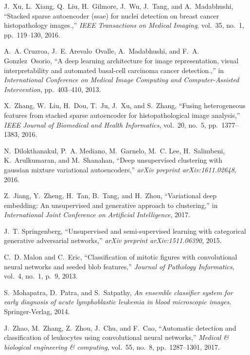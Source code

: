 \documentclass[journal]{IEEEtran}
\begin{document}
\begin{thebibliography}{10}
J.~Xu, L.~Xiang, Q.~Liu, H.~Gilmore, J.~Wu, J.~Tang, and A.~Madabhushi,
  ``Stacked sparse autoencoder (ssae) for nuclei detection on breast cancer
  histopathology images.,'' {\em IEEE Transactions on Medical Imaging},
  vol.~35, no.~1, pp.~119--130, 2016.

A.~A. Cruzroa, J.~E. Arevalo~Ovalle, A.~Madabhushi, and F.~A. Gonzlez~Osorio,
  ``A deep learning architecture for image representation, visual
  interpretability and automated basal-cell carcinoma cancer detection.,'' in
  {\em International Conference on Medical Image Computing and
  Computer-Assisted Intervention}, pp.~403--410, 2013.

X.~Zhang, W.~Liu, H.~Dou, T.~Ju, J.~Xu, and S.~Zhang, ``Fusing heterogeneous features from stacked sparse autoencoder for histopathological image analysis,''{\em
    IEEE Journal of Biomedical and Health Informatics}, vol.~20, no.~5, pp.~1377--1383, 2016.

N.~Dilokthanakul, P.~A. Mediano, M.~Garnelo, M.~C. Lee, H.~Salimbeni,
  K.~Arulkumaran, and M.~Shanahan, ``Deep unsupervised clustering with gaussian
  mixture variational autoencoders,'' {\em arXiv preprint arXiv:1611.02648},
  2016.

Z.~Jiang, Y.~Zheng, H.~Tan, B.~Tang, and H.~Zhou, ``Variational deep embedding:
  An unsupervised and generative approach to clustering,'' in {\em
  International Joint Conference on Artificial Intelligence}, 2017.

J.~T. Springenberg, ``Unsupervised and semi-supervised learning with
  categorical generative adversarial networks,'' {\em arXiv preprint
  arXiv:1511.06390}, 2015.

C.~D. Malon and C.~Eric, ``Classification of mitotic figures with convolutional
  neural networks and seeded blob features,'' {\em Journal of Pathology
  Informatics}, vol.~4, no.~1, p.~9, 2013.

S.~Mohapatra, D.~Patra, and S.~Satpathy, {\em An ensemble classifier system for
  early diagnosis of acute lymphoblastic leukemia in blood microscopic images}.
\newblock Springer-Verlag, 2014.

J.~Zhao, M.~Zhang, Z.~Zhou, J.~Chu, and F.~Cao, ``Automatic detection and
  classification of leukocytes using convolutional neural networks,'' {\em
  Medical \& biological engineering \& computing}, vol.~55, no.~8,
  pp.~1287--1301, 2017.


\end{thebibliography}
\end{document}
